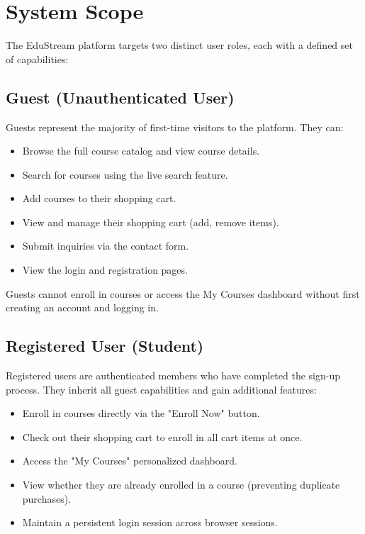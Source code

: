 \documentclass[12pt,a4paper]{report}
\begin{document}
\section{System Scope}

The EduStream platform targets two distinct user roles, each with a defined set of capabilities:

\subsection{Guest (Unauthenticated User)}

Guests represent the majority of first-time visitors to the platform. They can:

\begin{itemize}
    \item Browse the full course catalog and view course details.
    \item Search for courses using the live search feature.
    \item Add courses to their shopping cart.
    \item View and manage their shopping cart (add, remove items).
    \item Submit inquiries via the contact form.
    \item View the login and registration pages.
\end{itemize}

Guests cannot enroll in courses or access the My Courses dashboard without first creating an account and logging in.

\subsection{Registered User (Student)}

Registered users are authenticated members who have completed the sign-up process. They inherit all guest capabilities and gain additional features:

\begin{itemize}
    \item Enroll in courses directly via the "Enroll Now" button.
    \item Check out their shopping cart to enroll in all cart items at once.
    \item Access the "My Courses" personalized dashboard.
    \item View whether they are already enrolled in a course (preventing duplicate purchases).
    \item Maintain a persistent login session across browser sessions.
\end{itemize}
\end{document}

